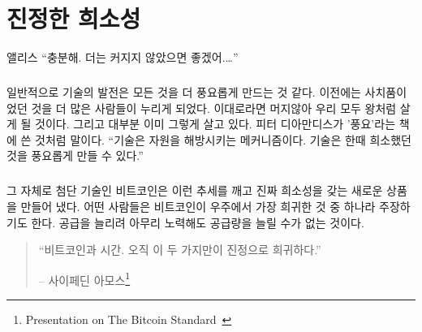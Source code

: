 
\chapter{진정한 희소성}
\label{les:2}

\begin{chapquote}{앨리스}
	\enquote{충분해. 더는 커지지 않았으면 좋겠어.\ldots}
\end{chapquote}


\paragraph{}
일반적으로 기술의 발전은 모든 것을 더 풍요롭게 만드는 것 같다. 이전에는 사치품이었던 것을 더 많은 사람들이 누리게 되었다. 
이대로라면 머지않아 우리 모두 왕처럼 살게 될 것이다. 그리고 대부분 이미 그렇게 살고 있다.
피터 디아만디스가 '풍요'라는 책에 쓴 것처럼 말이다.\cite{abundance} \enquote{기술은 자원을 해방시키는 메커니즘이다. 기술은 한때 희소했던 것을 풍요롭게 만들 수 있다.}

\paragraph{}
그 자체로 첨단 기술인 비트코인은 이런 추세를 깨고 진짜 희소성을 갖는 새로운 상품을 만들어 냈다. 
어떤 사람들은 비트코인이 우주에서 가장 희귀한 것 중 하나라 주장하기도 한다.
공급을 늘리려 아무리 노력해도 공급량을 늘릴 수가 없는 것이다. 

\begin{quotation}
	\begin{samepage} \enquote{비트코인과 시간. 오직 이 두 가지만이 진정으로 희귀하다.}
		\begin{flushright} -- 사이페딘 아모스\footnote{Presentation on The Bitcoin Standard~\cite{bitcoinstandard-pres}}
		\end{flushright}
	\end{samepage}
\end{quotation}

